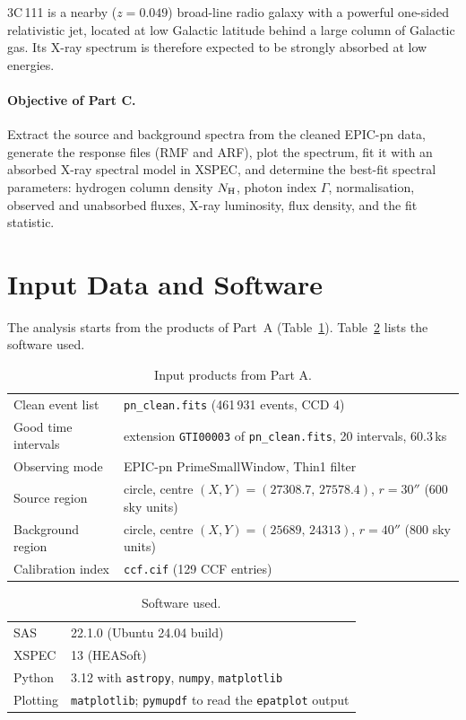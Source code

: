 \documentclass[11pt,a4paper]{article}
\newcommand{\nh}{N_{\rm H}}
\begin{document}
3C\,111 is a nearby ($z=0.049$) broad-line radio galaxy with a powerful one-sided relativistic jet, located at low Galactic latitude behind a large column of Galactic gas. Its X-ray spectrum is therefore expected to be strongly absorbed at low energies.

\paragraph{Objective of Part C.} Extract the source and background spectra from the cleaned EPIC-pn data, generate the response files (RMF and ARF), plot the spectrum, fit it with an absorbed X-ray spectral model in XSPEC, and determine the best-fit spectral parameters: hydrogen column density $\nh$, photon index $\Gamma$, normalisation, observed and unabsorbed fluxes, X-ray luminosity, flux density, and the fit statistic.

\section{Input Data and Software}

The analysis starts from the products of Part~A (Table~\ref{tab:input}). Table~\ref{tab:software} lists the software used.

\begin{table}[H]
\centering
\caption{Input products from Part A.}
\label{tab:input}
\begin{tabular}{ll}
\toprule
Clean event list & \texttt{pn\_clean.fits} (461\,931 events, CCD 4) \\
Good time intervals & extension \texttt{GTI00003} of \texttt{pn\_clean.fits}, 20 intervals, 60.3\,ks \\
Observing mode & EPIC-pn PrimeSmallWindow, Thin1 filter \\
Source region & circle, centre $(X,Y)=(27308.7,\,27578.4)$, $r=30''$ (600 sky units) \\
Background region & circle, centre $(X,Y)=(25689,\,24313)$, $r=40''$ (800 sky units) \\
Calibration index & \texttt{ccf.cif} (129 CCF entries) \\
\bottomrule
\end{tabular}
\end{table}

\begin{table}[H]
\centering
\caption{Software used.}
\label{tab:software}
\begin{tabular}{ll}
\toprule
SAS & 22.1.0 (Ubuntu 24.04 build) \\
XSPEC & 13 (HEASoft) \\
Python & 3.12 with \texttt{astropy}, \texttt{numpy}, \texttt{matplotlib} \\
Plotting & \texttt{matplotlib}; \texttt{pymupdf} to read the \texttt{epatplot} output \\
\bottomrule
\end{tabular}
\end{table}
\end{document}
